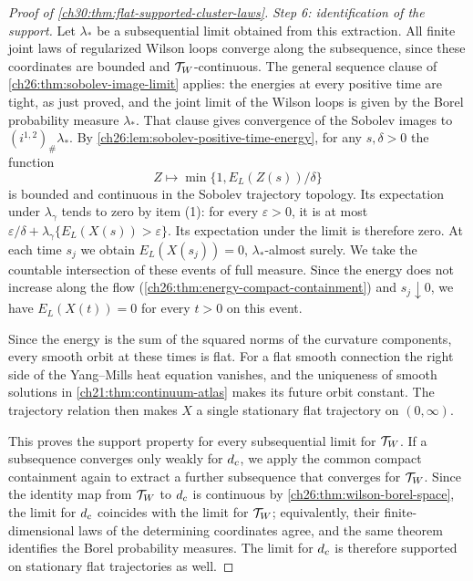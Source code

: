 \begin{proof}[Proof of \cref{ch30:thm:flat-supported-cluster-laws}]
\emph{Step 6: identification of the support.} Let $\lambda_*$ be a subsequential limit obtained from this extraction. All finite joint laws of regularized Wilson loops converge along the subsequence, since these coordinates are bounded and $\mathcal T_W$-continuous. The general sequence clause of \cref{ch26:thm:sobolev-image-limit} applies: the energies at every positive time are tight, as just proved, and the joint limit of the Wilson loops is given by the Borel probability measure $\lambda_*$. That clause gives convergence of the Sobolev images to $(i^{1,2})_\#\lambda_*$. By \cref{ch26:lem:sobolev-positive-time-energy}, for any $s,\delta>0$ the function
\[
 Z\longmapsto\min\{1,E_L(Z(s))/\delta\}
\]
is bounded and continuous in the Sobolev trajectory topology. Its expectation under $\lambda_\gamma$ tends to zero by item (1): for every $\varepsilon>0$, it is at most $\varepsilon/\delta+\lambda_\gamma\{E_L(X(s))>\varepsilon\}$. Its expectation under the limit is therefore zero. At each time $s_j$ we obtain $E_L(X(s_j))=0$, $\lambda_*$-almost surely. We take the countable intersection of these events of full measure. Since the energy does not increase along the flow (\cref{ch26:thm:energy-compact-containment}) and $s_j\downarrow0$, we have $E_L(X(t))=0$ for every $t>0$ on this event.

Since the energy is the sum of the squared norms of the curvature components, every smooth orbit at these times is flat. For a flat smooth connection the right side of the Yang--Mills heat equation vanishes, and the uniqueness of smooth solutions in \cref{ch21:thm:continuum-atlas} makes its future orbit constant. The trajectory relation then makes $X$ a single stationary flat trajectory on $(0,\infty)$.

This proves the support property for every subsequential limit for $\mathcal T_W$. If a subsequence converges only weakly for $d_c$, we apply the common compact containment again to extract a further subsequence that converges for $\mathcal T_W$. Since the identity map from $\mathcal T_W$ to $d_c$ is continuous by \cref{ch26:thm:wilson-borel-space}, the limit for $d_c$ coincides with the limit for $\mathcal T_W$; equivalently, their finite-dimensional laws of the determining coordinates agree, and the same theorem identifies the Borel probability measures. The limit for $d_c$ is therefore supported on stationary flat trajectories as well.


\end{proof}
